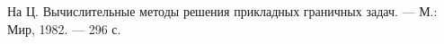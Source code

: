 \begin{thebibliography}{111}
%
%
%
%
%
%
%
%
%
%
%
%


На Ц. Вычислительные методы решения прикладных граничных задач.
 --- М.: Мир, 1982. --- 296 с.

\end{thebibliography}
